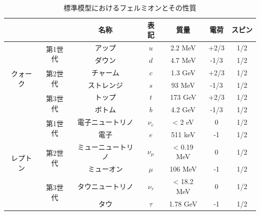 \begin{table}[]
    \centering
    \caption[標準模型のフェルミオン]{標準模型におけるフェルミオンとその性質\cite{PDG2020}}
    \label{tab:fermion}

    \begin{tabular}{ccccccc}
    \hline
                                               &                                            & 名称        & 表記           & 質量                 & 電荷   & スピン \\ 
    \hline\hline
    \multicolumn{1}{c|}{\multirow{6}{*}{クォーク}} & \multicolumn{1}{c|}{\multirow{2}{*}{第1世代}} & アップ       & $u$            & 2.2 MeV            & +2/3 & 1/2 \\
    \multicolumn{1}{c|}{}                      & \multicolumn{1}{c|}{}                      & ダウン       & $d$            & 4.7 MeV            & -1/3 & 1/2 \\ \cline{2-7}
    \multicolumn{1}{c|}{}                      & \multicolumn{1}{c|}{\multirow{2}{*}{第2世代}} & チャーム      & $c$            & 1.3 GeV            & +2/3 & 1/2 \\
    \multicolumn{1}{c|}{}                      & \multicolumn{1}{c|}{}                      & ストレンジ     & $s$            & 93 MeV             & -1/3 & 1/2 \\ \cline{2-7}
    \multicolumn{1}{c|}{}                      & \multicolumn{1}{c|}{\multirow{2}{*}{第3世代}} & トップ       & $t$            & 173 GeV            & +2/3 & 1/2 \\
    \multicolumn{1}{c|}{}                      & \multicolumn{1}{c|}{}                      & ボトム       & $b$            & 4.2 GeV            & -1/3 & 1/2 \\ \cline{2-2}
    \hline\hline
    \multicolumn{1}{c|}{\multirow{6}{*}{レプトン}} & \multicolumn{1}{c|}{\multirow{2}{*}{第1世代}} & 電子ニュートリノ  & $\nu_{e}$    & < 2 eV     & 0    & 1/2 \\
    \multicolumn{1}{c|}{}                      & \multicolumn{1}{c|}{}                      & 電子        & $e$            & 511 keV            & -1   & 1/2 \\ \cline{2-7}
    \multicolumn{1}{c|}{}                      & \multicolumn{1}{c|}{\multirow{2}{*}{第2世代}} & ミューニュートリノ & $\nu_{\mu}$  & < 0.19 MeV & 0    & 1/2 \\
    \multicolumn{1}{c|}{}                      & \multicolumn{1}{c|}{}                      & ミューオン     & $\mu$        & 106 MeV            & -1   & 1/2 \\ \cline{2-7}
    \multicolumn{1}{c|}{}                      & \multicolumn{1}{c|}{\multirow{2}{*}{第3世代}} & タウニュートリノ  & $\nu_{\tau}$ & < 18.2 MeV & 0    & 1/2 \\
    \multicolumn{1}{c|}{}                      & \multicolumn{1}{c|}{}                      & タウ        & $\tau$       & 1.78 GeV           & -1   & 1/2 \\ \hline
    \end{tabular}
\end{table}


